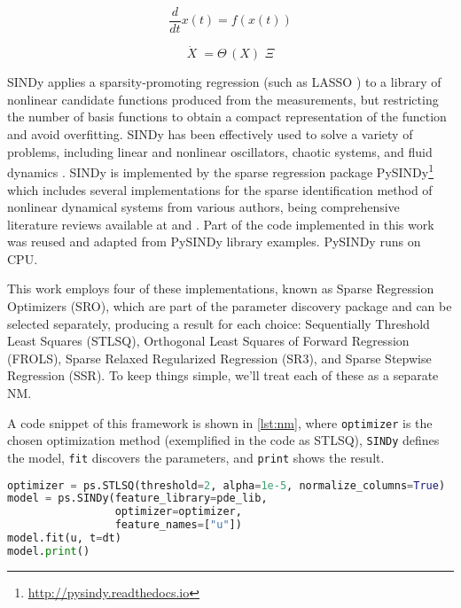 \begin{equation}
\frac{d}{dt}x(t) = f(x(t))
\label{eq:sn1}\end{equation}

\begin{equation}
\dot{X} \; = \Theta \,(X)\,\,\Xi
\label{eq:sn2}
\end{equation}

SINDy applies a sparsity-promoting regression (such as LASSO \cite{Tibshirani2011}) to a library of nonlinear candidate functions produced from the measurements, but restricting the number of basis functions to obtain a compact representation of the function and avoid overfitting. SINDy has been effectively used to solve a variety of problems, including linear and nonlinear oscillators, chaotic systems, and fluid dynamics \cite{Brunton2016}. SINDy is implemented by the sparse regression package PySINDy\footnote{\url{http://pysindy.readthedocs.io}} which includes several implementations for the sparse identification method of nonlinear dynamical systems from various authors, being  comprehensive literature reviews available at \cite{DeSilva2020} and \cite{Kaptanoglu2022}. Part of the code implemented in this work was reused and adapted from PySINDy library examples. PySINDy runs on CPU.

This work employs four of these implementations, known as Sparse Regression Optimizers (SRO), which are part of the parameter discovery package and can be selected separately, producing a result for each choice: Sequentially Threshold Least Squares (STLSQ), Orthogonal Least Squares of Forward Regression (FROLS), Sparse Relaxed Regularized Regression (SR3), and Sparse Stepwise Regression (SSR). To keep things simple, we'll treat each of these as a separate NM.

A code snippet of this framework is shown in \autoref{lst:nm}, where \texttt{optimizer} is the chosen optimization method (exemplified in the code as STLSQ), \texttt{SINDy} defines the model, \texttt{fit} discovers the parameters, and \texttt{print} shows the result. 

\begin{minipage}[htb]{\columnwidth}
\begin{lstlisting}[language=Python, label=lst:nm, 
caption={Python code snippet that implements the NM for data-driven PDE parameter discovery. The STLSQ is one of the optimizers in the PySINDy framework.}]
optimizer = ps.STLSQ(threshold=2, alpha=1e-5, normalize_columns=True)
model = ps.SINDy(feature_library=pde_lib,
                 optimizer=optimizer,
                 feature_names=["u"])
model.fit(u, t=dt)
model.print()
\end{lstlisting}
\end{minipage}%

